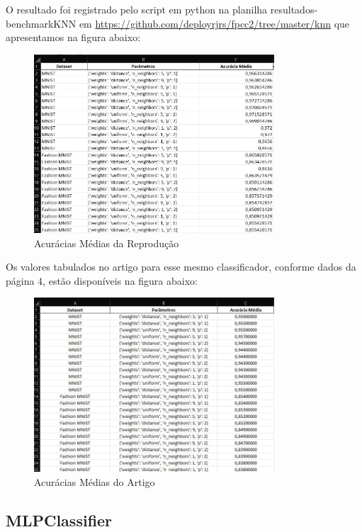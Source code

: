 \documentclass{article}
\begin{document}
O resultado foi registrado pelo script em python na planilha resultados-benchmarkKNN em \url{https://github.com/deployrjrs/fpcc2/tree/master/knn} que apresentamos na figura abaixo:
\begin{figure}[H]
    \centering
    \includegraphics[width=0.8\textwidth]{knnplan01.jpg}
    \caption{Acurácias Médias da Reprodução}
    \label{fig:plan1}
\end{figure}

Os valores tabulados no artigo para esse mesmo classificador, conforme dados da página 4, estão disponíveis na figura abaixo:
\begin{figure}[H]
    \centering
    \includegraphics[width=0.8\textwidth]{knnplan02.jpg}
    \caption{Acurácias Médias do Artigo}
    \label{fig:plan2}
\end{figure}

\subsection{MLPClassifier}
\end{document}
